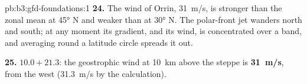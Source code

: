 \begin{solution}{pb:b3:gfd-foundations:1}
\textbf{24.} The wind of Orrin, \qty{31}{m/s}, is stronger than the zonal mean
at \ang{45} N and weaker than at \ang{30} N. The polar-front jet wanders
north and south; at any moment its gradient, and its wind, is concentrated
over a band, and averaging round a latitude circle spreads it out.

\textbf{25.} $10.0 + 21.3$: the geostrophic wind at \qty{10}{km} above the
steppe is \textbf{\qty[text-series-to-math=true]{31}{m/s}}, from the west
(\qty{31.3}{m/s} by the calculation).
\end{solution}
